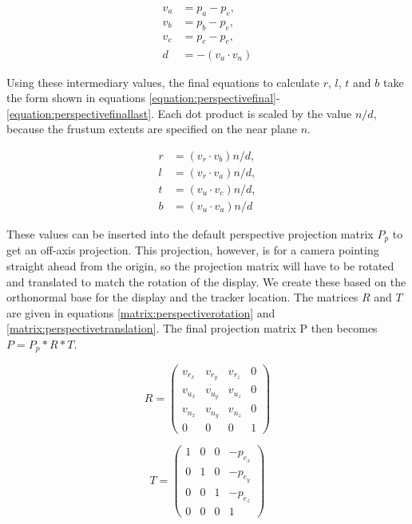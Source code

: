 \documentclass[12pt,a4paper,oneside,pdftex]{report}
\begin{document}
\begin{align} \label{equation:perspectiveintermediary}
    v_a& = p_a - p_e, \\
    v_b& = p_b - p_e, \\
    v_c& = p_c - p_e, \\ \label{equation:perspectiveintermediarylast}
    d& = -(v_a \cdot v_n) 
\end{align}

Using these intermediary values, the final equations to calculate $r$, $l$, $t$ and $b$ take the form shown in equations \eqref{equation:perspectivefinal}-\eqref{equation:perspectivefinallast}. Each dot product is scaled by the value $n/d$, because the frustum extents are specified on the near plane $n$.

\begin{align} \label{equation:perspectivefinal}
    r& = (v_r \cdot v_b)n/d, \\
    l& = (v_r \cdot v_a)n/d, \\
    t& = (v_u \cdot v_c)n/d, \\ \label{equation:perspectivefinallast}
    b& = (v_u \cdot v_a)n/d 
\end{align}

These values can be inserted into the default perspective projection matrix $P_p$ to get an off-axis projection. This projection, however, is for a camera pointing straight ahead from the origin, so the projection matrix will have to be rotated and translated to match the rotation of the display. We create these based on the orthonormal base for the display and the tracker location. The matrices $R$ and $T$ are given in equations \eqref{matrix:perspectiverotation} and \eqref{matrix:perspectivetranslation}. The final projection matrix P then becomes $P = P_p * R * T$.

\begin{equation}
\label{matrix:perspectiverotation}
  R = \begin{pmatrix}
  v_r_x & v_r_y & v_r_z & 0 \\[0.3em]
  v_u_x & v_u_y & v_u_z & 0 \\[0.3em]
  v_n_x & v_n_y & v_n_z & 0 \\[0.3em]
  0 & 0 & 0 & 1
\end{pmatrix}
\end{equation}
 
\begin{equation}
\label{matrix:perspectivetranslation}
  T = \begin{pmatrix}
  1 & 0 & 0 & -p_e_x \\[0.3em]
  0 & 1 & 0 & -p_e_y \\[0.3em]
  0 & 0 & 1 & -p_e_z \\[0.3em]
  0 & 0 & 0 & 1
\end{pmatrix}
\end{equation}
\end{document}
